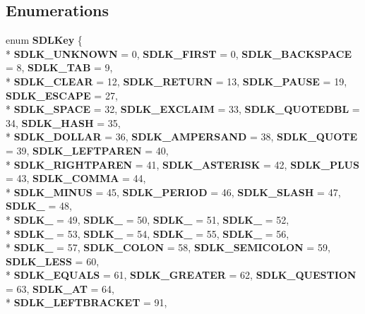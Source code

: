 \subsection*{Enumerations}
\begin{DoxyCompactItemize}
\item 
enum {\bf S\+D\+L\+Key} \{ \\*
{\bf S\+D\+L\+K\+\_\+\+U\+N\+K\+N\+O\+W\+N} = 0, 
{\bf S\+D\+L\+K\+\_\+\+F\+I\+R\+S\+T} = 0, 
{\bf S\+D\+L\+K\+\_\+\+B\+A\+C\+K\+S\+P\+A\+C\+E} = 8, 
{\bf S\+D\+L\+K\+\_\+\+T\+A\+B} = 9, 
\\*
{\bf S\+D\+L\+K\+\_\+\+C\+L\+E\+A\+R} = 12, 
{\bf S\+D\+L\+K\+\_\+\+R\+E\+T\+U\+R\+N} = 13, 
{\bf S\+D\+L\+K\+\_\+\+P\+A\+U\+S\+E} = 19, 
{\bf S\+D\+L\+K\+\_\+\+E\+S\+C\+A\+P\+E} = 27, 
\\*
{\bf S\+D\+L\+K\+\_\+\+S\+P\+A\+C\+E} = 32, 
{\bf S\+D\+L\+K\+\_\+\+E\+X\+C\+L\+A\+I\+M} = 33, 
{\bf S\+D\+L\+K\+\_\+\+Q\+U\+O\+T\+E\+D\+B\+L} = 34, 
{\bf S\+D\+L\+K\+\_\+\+H\+A\+S\+H} = 35, 
\\*
{\bf S\+D\+L\+K\+\_\+\+D\+O\+L\+L\+A\+R} = 36, 
{\bf S\+D\+L\+K\+\_\+\+A\+M\+P\+E\+R\+S\+A\+N\+D} = 38, 
{\bf S\+D\+L\+K\+\_\+\+Q\+U\+O\+T\+E} = 39, 
{\bf S\+D\+L\+K\+\_\+\+L\+E\+F\+T\+P\+A\+R\+E\+N} = 40, 
\\*
{\bf S\+D\+L\+K\+\_\+\+R\+I\+G\+H\+T\+P\+A\+R\+E\+N} = 41, 
{\bf S\+D\+L\+K\+\_\+\+A\+S\+T\+E\+R\+I\+S\+K} = 42, 
{\bf S\+D\+L\+K\+\_\+\+P\+L\+U\+S} = 43, 
{\bf S\+D\+L\+K\+\_\+\+C\+O\+M\+M\+A} = 44, 
\\*
{\bf S\+D\+L\+K\+\_\+\+M\+I\+N\+U\+S} = 45, 
{\bf S\+D\+L\+K\+\_\+\+P\+E\+R\+I\+O\+D} = 46, 
{\bf S\+D\+L\+K\+\_\+\+S\+L\+A\+S\+H} = 47, 
{\bf S\+D\+L\+K\+\_} = 48, 
\\*
{\bf S\+D\+L\+K\+\_} = 49, 
{\bf S\+D\+L\+K\+\_} = 50, 
{\bf S\+D\+L\+K\+\_} = 51, 
{\bf S\+D\+L\+K\+\_} = 52, 
\\*
{\bf S\+D\+L\+K\+\_} = 53, 
{\bf S\+D\+L\+K\+\_} = 54, 
{\bf S\+D\+L\+K\+\_} = 55, 
{\bf S\+D\+L\+K\+\_} = 56, 
\\*
{\bf S\+D\+L\+K\+\_} = 57, 
{\bf S\+D\+L\+K\+\_\+\+C\+O\+L\+O\+N} = 58, 
{\bf S\+D\+L\+K\+\_\+\+S\+E\+M\+I\+C\+O\+L\+O\+N} = 59, 
{\bf S\+D\+L\+K\+\_\+\+L\+E\+S\+S} = 60, 
\\*
{\bf S\+D\+L\+K\+\_\+\+E\+Q\+U\+A\+L\+S} = 61, 
{\bf S\+D\+L\+K\+\_\+\+G\+R\+E\+A\+T\+E\+R} = 62, 
{\bf S\+D\+L\+K\+\_\+\+Q\+U\+E\+S\+T\+I\+O\+N} = 63, 
{\bf S\+D\+L\+K\+\_\+\+A\+T} = 64, 
\\*
{\bf S\+D\+L\+K\+\_\+\+L\+E\+F\+T\+B\+R\+A\+C\+K\+E\+T} = 91, 

\end{DoxyCompactItemize}
